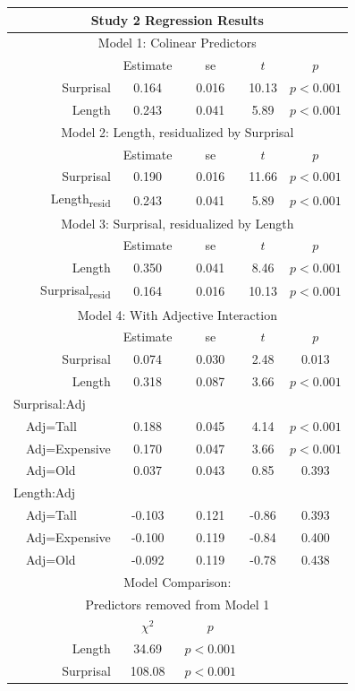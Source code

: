 \noindent
\footnotesize{
\begin{tabular}{r|cccc}
\hline
\hline
\multicolumn{5}{c}{\textbf{Study 2 Regression Results}} \\
\hline
\hline
\multicolumn{5}{c}{Model 1: Colinear Predictors} \\
& Estimate & se & $t$ & $p$ \\
\hline
Surprisal & 0.164 & 0.016 & 10.13 & $p<0.001$ \\
Length & 0.243 & 0.041 & 5.89 & $p<0.001$ \\
\hline
\hline
\multicolumn{5}{c}{Model 2: Length, residualized by Surprisal} \\
& Estimate & se & $t$ & $p$ \\
\hline
Surprisal & 0.190 & 0.016 & 11.66 & $p<0.001$ \\
Length\textsubscript{resid} & 0.243 & 0.041 & 5.89 & $p<0.001$ \\
\hline
\hline
\multicolumn{5}{c}{Model 3: Surprisal, residualized by Length} \\
& Estimate & se & $t$ & $p$ \\
\hline
Length & 0.350 & 0.041 & 8.46 & $p<0.001$ \\
Surprisal\textsubscript{resid} & 0.164 & 0.016 & 10.13 & $p<0.001$ \\
\hline
\hline
\multicolumn{5}{c}{Model 4: With Adjective Interaction} \\
& Estimate & se & $t$ & $p$ \\
\hline
Surprisal & 0.074 & 0.030 & 2.48 & 0.013 \\
Length & 0.318 & 0.087 & 3.66 & $p<0.001$ \\
\multicolumn{1}{l|}{Surprisal:Adj} & & & & \\
\multicolumn{1}{l|}{\ \ Adj=Tall} & 0.188 & 0.045 & 4.14 & $p<0.001$ \\
\multicolumn{1}{l|}{\ \ Adj=Expensive} & 0.170 & 0.047 & 3.66 & $p<0.001$ \\
\multicolumn{1}{l|}{\ \ Adj=Old} & 0.037 & 0.043 & 0.85 & 0.393 \\
\multicolumn{1}{l|}{Length:Adj} & & & & \\
\multicolumn{1}{l|}{\ \ Adj=Tall} & -0.103 & 0.121 & -0.86 & 0.393 \\
\multicolumn{1}{l|}{\ \ Adj=Expensive} & -0.100 & 0.119 & -0.84 & 0.400 \\
\multicolumn{1}{l|}{\ \ Adj=Old} & -0.092 & 0.119 & -0.78 & 0.438 \\
\hline
\hline
\multicolumn{5}{c}{Model Comparison:} \\
\multicolumn{5}{c}{Predictors removed from Model 1} \\
& $\chi^2$ & $p$ \\
\hline
Length & 34.69 & $p<0.001$ \\
Surprisal & 108.08 & $p<0.001$ \\
\hline
\hline
\end{tabular}
}



